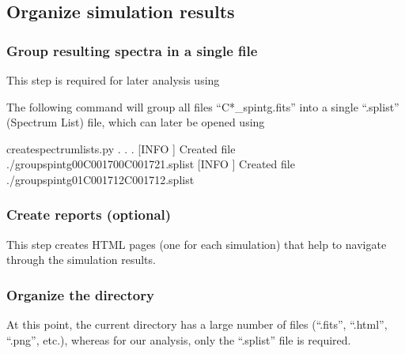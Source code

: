 \documentclass[letterpaper,10pt,english]{sphinxmanual}
\begin{document}
\subsection{Organize simulation results}
\label{\detokenize{aosss:organize-simulation-results}}

\subsubsection{Group resulting spectra in a single file}
\label{\detokenize{aosss:group-resulting-spectra-in-a-single-file}}
This step is required for later analysis using 

The following command will group all files “C*\_spintg.fits” into a single “.splist” (Spectrum List) file,
which can later be opened using 

\begin{sphinxVerbatim}[commandchars=\\\{\}]
\PYGZdl{} create\PYGZhy{}spectrum\PYGZhy{}lists.py
.
.
.
[INFO    ] Created file \PYGZsq{}./group\PYGZhy{}spintg\PYGZhy{}00\PYGZhy{}C001700\PYGZhy{}C001721.splist\PYGZsq{}
[INFO    ] Created file \PYGZsq{}./group\PYGZhy{}spintg\PYGZhy{}01\PYGZhy{}C001712\PYGZhy{}C001712.splist\PYGZsq{}
\end{sphinxVerbatim}


\subsubsection{Create reports (optional)}
\label{\detokenize{aosss:create-reports-optional}}
This step creates HTML pages (one for each simulation) that help to navigate through the simulation
results.

\begin{sphinxVerbatim}[commandchars=\\\{\}]
 
\end{sphinxVerbatim}


\subsubsection{Organize the directory}
\label{\detokenize{aosss:organize-the-directory}}
At this point, the current directory has a large number of files (“.fits”, “.html”, “.png”, etc.),
whereas for our analysis, only the “.splist” file is required.
\end{document}
